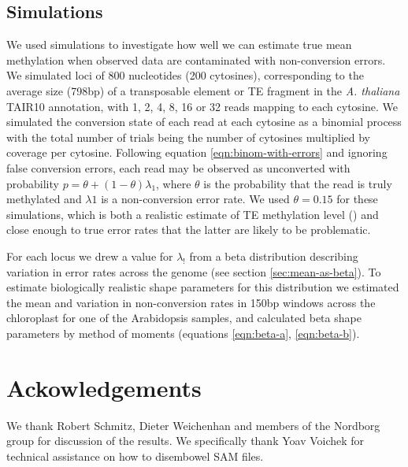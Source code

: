 \documentclass[12pt,longbibliography]{article}
\begin{document}
\subsection{Simulations}

We used simulations to investigate how well we can estimate true mean methylation when observed data are contaminated with non-conversion errors.
We simulated loci of 800 nucleotides (200 cytosines), corresponding to the average size (798bp) of a transposable element or TE fragment in the \textit{A. thaliana} TAIR10 annotation, with 1, 2, 4, 8, 16 or 32 reads mapping to each cytosine.
We simulated the conversion state of each read at each cytosine as a binomial process with the total number of trials being the number of cytosines multiplied by coverage per cytosine.
Following equation \ref{eqn:binom-with-errors} and ignoring false conversion errors, each read may be observed as unconverted with probability $p=\theta + (1-\theta)\lambda_1$, where $\theta$ is the probability that the read is truly methylated and $\lambda1$ is a non-conversion error rate.
We used $\theta=0.15$ for these simulations, which is both a realistic estimate of TE methylation level (\cite{dubin2015dna}) and close enough to true error rates that the latter are likely to be problematic.

For each locus we drew a value for $\lambda_!$ from a beta distribution describing variation in error rates across the genome (see section \ref{sec:mean-as-beta}).
To estimate biologically realistic shape parameters for this distribution we estimated the mean and variation in non-conversion rates in 150bp windows across the chloroplast for one of the Arabidopsis samples, and calculated beta shape parameters by method of moments (equations \ref{eqn:beta-a}, \ref{eqn:beta-b}). 

\section{Ackowledgements}

We thank Robert Schmitz, Dieter Weichenhan and members of the Nordborg group for discussion of the results.
We specifically thank Yoav Voichek for technical assistance on how to disembowel SAM files.

\printbibliography %
\end{document}
